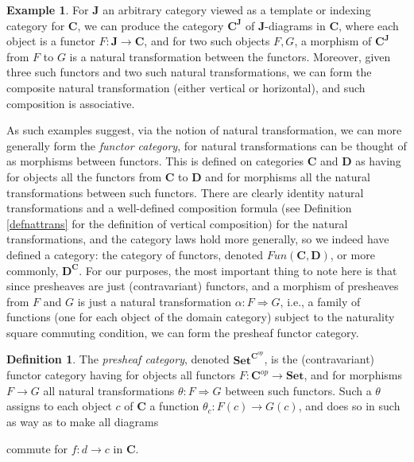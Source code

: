 \documentclass[a4paper]{book}
\theoremstyle{definition}
\newtheorem{example}{Example}[section]
\theoremstyle{definition}
\newtheorem{definition}{Definition}[section]
\theoremstyle{definition}
\theoremstyle{theorem}
\theoremstyle{definition}
\begin{document}
\begin{example}
	For \textbf{J} an arbitrary category viewed as a template or indexing category  for \textbf{C}, we can produce the category $\textbf{C}^{\textbf{J}}$ of $\textbf{J}$-diagrams in \textbf{C}, where each object is a functor $F: \textbf{J} \rightarrow \textbf{C}$, and for two such objects $F, G$, a morphism of $\textbf{C}^{\textbf{J}}$ from $F$ to $G$ is a natural transformation between the functors. Moreover, given three such functors and two such natural transformations, we can form the composite natural transformation (either vertical or horizontal), and such composition is associative.
\end{example}
As such examples suggest, via the notion of natural transformation, we can more generally form the \textit{functor category}, for natural transformations can be thought of as morphisms between functors. This is defined on categories \textbf{C} and \textbf{D} as having for objects all the functors from \textbf{C} to \textbf{D} and for morphisms all the natural transformations between such functors. There are clearly identity natural transformations and a well-defined composition formula (see Definition \ref{defnattrans} for the definition of vertical composition) for the natural transformations, and the category laws hold more generally, so we indeed have defined a category: the category of functors, denoted $Fun(\textbf{C}, \textbf{D})$, or more commonly, $\textbf{D}^{\textbf{C}}$. For our purposes, the most important thing to note here is that since presheaves are just (contravariant) functors, and a morphism of presheaves from $F$ and $G$ is just a natural transformation $\alpha: F \Rightarrow G$, i.e., a family of functions (one for each object of the domain category) subject to the naturality square commuting condition, we can form the presheaf functor category.  
\begin{definition}
	The \textit{presheaf category}, denoted $\textbf{Set}^{\textbf{C}^{op}}$, is the (contravariant) functor category having for objects all functors $F: \textbf{C}^{op} \rightarrow \textbf{Set}$, and for morphisms $F \rightarrow G$ all natural transformations $\theta: F \Rightarrow G$ between such functors. Such a $\theta$ assigns to each object $c$ of \textbf{C} a function $\theta_c: F(c) \rightarrow G(c)$, and does so in such as way as to make all diagrams 
	\begin{center} 
	\end{center} 
	commute for $f: d \rightarrow c$ in \textbf{C}.
\end{definition}
\end{document}
